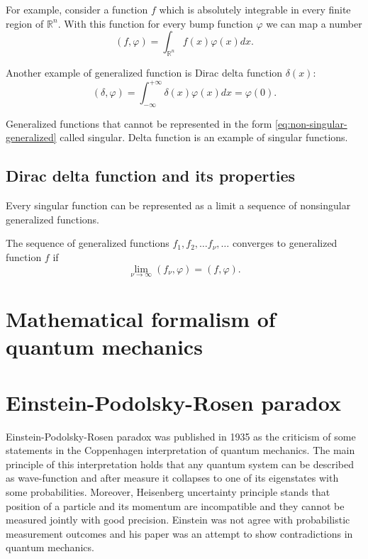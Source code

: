 \documentclass[11pt]{article}
\newenvironment{definition}[1][Definition]{\begin{trivlist}
\item[\hskip \labelsep {\bfseries #1}]}{\end{trivlist}}
\begin{document}
For example, consider a function $f$ which is absolutely integrable in every finite region of $\mathbb{R}^n$. With this function for every bump function $\varphi$ we can map a number 
\begin{equation}
(f, \varphi) = \int_{\mathbb{R}^n} f(x)\varphi(x) dx. \label{eq:non-singular-generalized}
\end{equation}

Another example of generalized function is Dirac delta function $\delta(x)$:
\begin{equation}
(\delta, \varphi) = \int_{-\infty}^{+\infty} \delta(x)\varphi(x) dx = \varphi(0). \label{eq:delta-function}
\end{equation}

Generalized functions that cannot be represented in the form \eqref{eq:non-singular-generalized} called singular. Delta function is an example of singular functions.

\subsection{Dirac delta function and its properties}

Every singular function can be represented as a limit a sequence of nonsingular generalized functions.
\begin{definition}
The sequence of generalized functions $f_1, f_2,\ldots f_\nu,\ldots$ converges to generalized function $f$ if
\[
\lim_{\nu\to\infty} (f_\nu, \varphi) = (f, \varphi).
\]
\end{definition}


\section{Mathematical formalism of quantum mechanics}

\section{Einstein-Podolsky-Rosen paradox}
Einstein-Podolsky-Rosen paradox was published in 1935 as the criticism of some statements in the Coppenhagen interpretation of quantum mechanics. The main principle of this interpretation holds that any quantum system can be described as wave-function and after measure it collapses to one of its eigenstates with some probabilities. Moreover, Heisenberg uncertainty principle stands that position of a particle and its momentum are incompatible and they cannot be measured jointly with good precision. Einstein was not agree with probabilistic measurement outcomes and his paper was an attempt to show contradictions in quantum mechanics.
\end{document}
